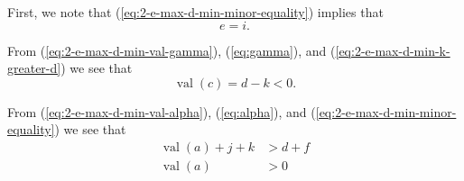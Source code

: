 \documentclass{amsart}
\theoremstyle{definition}
\def\val{\mathop{\mathrm{val}}}
\begin{document}
  First, we note that (\ref{eq:2-e-max-d-min-minor-equality}) implies
  that
  \begin{equation}
    \label{eq:2-e-max-d-min-e-equals-i}
    e = i.
  \end{equation}
  
  From (\ref{eq:2-e-max-d-min-val-gamma}), (\ref{eq:gamma}), and
  (\ref{eq:2-e-max-d-min-k-greater-d})  we see
  that \begin{equation}
    \label{eq:2-e-max-d-min-val-c}
    \val(c) = d - k < 0.
  \end{equation}

  From (\ref{eq:2-e-max-d-min-val-alpha}), (\ref{eq:alpha}), and
  (\ref{eq:2-e-max-d-min-minor-equality}) we see that
  \begin{align}
    \val(a) + j + k &> d + f \nonumber \\
    \label{eq:2-e-max-d-min-val-a}
    \val(a) &> 0
  \end{align}
\end{document}

